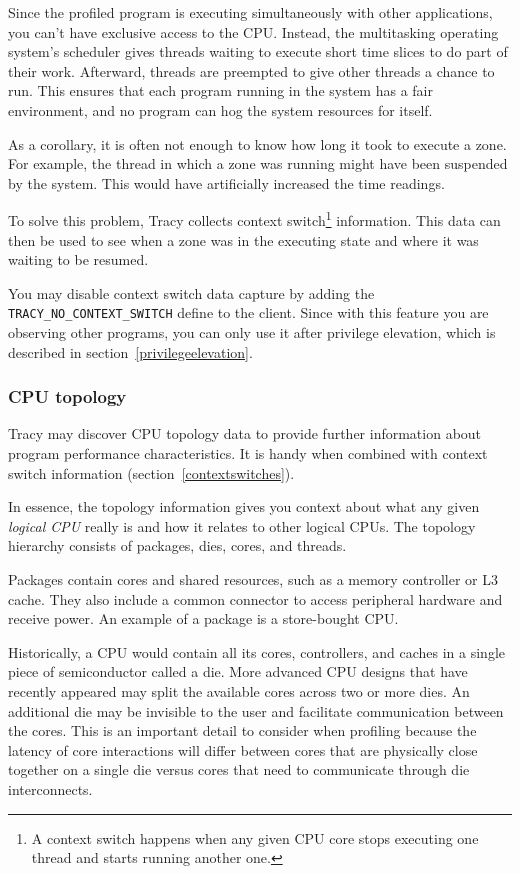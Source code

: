 \documentclass[hidelinks,titlepage,a4paper,twoside]{article}
\begin{document}
Since the profiled program is executing simultaneously with other applications, you can't have exclusive access to the CPU. Instead, the multitasking operating system's scheduler gives threads waiting to execute short time slices to do part of their work. Afterward, threads are preempted to give other threads a chance to run. This ensures that each program running in the system has a fair environment, and no program can hog the system resources for itself.

As a corollary, it is often not enough to know how long it took to execute a zone. For example, the thread in which a zone was running might have been suspended by the system. This would have artificially increased the time readings.

To solve this problem, Tracy collects context switch\footnote{A context switch happens when any given CPU core stops executing one thread and starts running another one.} information. This data can then be used to see when a zone was in the executing state and where it was waiting to be resumed.

You may disable context switch data capture by adding the \texttt{TRACY\_NO\_CONTEXT\_SWITCH} define to the client. Since with this feature you are observing other programs, you can only use it after privilege elevation, which is described in section~\ref{privilegeelevation}.

\subsubsection{CPU topology}
\label{cputopology}

Tracy may discover CPU topology data to provide further information about program performance characteristics. It is handy when combined with context switch information (section~\ref{contextswitches}).

In essence, the topology information gives you context about what any given \emph{logical CPU} really is and how it relates to other logical CPUs. The topology hierarchy consists of packages, dies, cores, and threads.

Packages contain cores and shared resources, such as a memory controller or L3 cache. They also include a common connector to access peripheral hardware and receive power. An example of a package is a store-bought CPU.

Historically, a CPU would contain all its cores, controllers, and caches in a single piece of semiconductor called a die. More advanced CPU designs that have recently appeared may split the available cores across two or more dies. An additional die may be invisible to the user and facilitate communication between the cores. This is an important detail to consider when profiling because the latency of core interactions will differ between cores that are physically close together on a single die versus cores that need to communicate through die interconnects.
\end{document}
